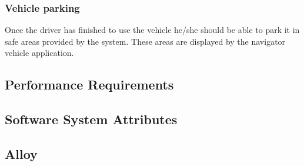 \subsubsection{Vehicle parking}


Once the driver has finished to use the vehicle he/she should be able to park it in safe areas provided by the system. These areas are displayed by the navigator vehicle application.



\subsection{Performance Requirements}

\subsection{Software System Attributes}

\subsection{Alloy}